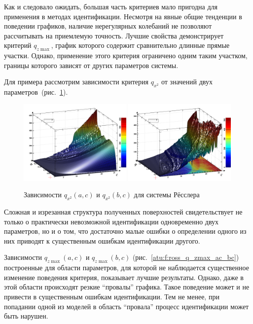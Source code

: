 Как и следовало ожидать, большая часть критериев мало пригодна
для применения в методах идентификации. Несмотря на явные
общие тенденции в поведении графиков, наличие нерегулярных колебаний
не позволяют рассчитывать на приемлемую точность.
Лучшие свойства демонстрирует критерий $q_{z \max{}}$,
график которого содержит сравнительно длинные прямые участки.
Однако, применение этого критерия ограничено одним таким участком,
границы которого зависят от других параметров системы.

Для примера рассмотрим зависимости критерия $q_{x^2}$
от значений двух параметров~(рис.~\ref{atu:f:ross_q_x2_ac_bc}).

\begin{figure}[ht!]
\begin{center}
  \includegraphics[width=0.49\textwidth]{p/cha/ross/ross_pwr-x_a_c.png}
  \hfill
  \includegraphics[width=0.49\textwidth]{p/cha/ross/ross_pwr-x_b_c.png}
\end{center}
  \caption{Зависимости $q_{x^2}(a,c)$ и  $q_{x^2}(b,c) $ для системы Рёсслера}
\label{atu:f:ross_q_x2_ac_bc}
\end{figure}

Сложная и изрезанная структура полученных поверхностей
свидетельствует не только о практически невозможной идентификации одновременно двух параметров,
но и о том, что достаточно малые ошибки о определении одного из них
приводят к существенным ошибкам идентификации другого.

Зависимости $q_{z \max{}}(a,c)$ и  $q_{z \max{}}(b,c) $
(рис.~\ref{atu:f:ross_q_zmax_ac_bc}) построенные для
области параметров, для которой не наблюдается существенное изменение
поведения критерия, показывает лучшие результаты. Однако,
даже в этой области происходят резкие ``провалы'' графика.
Такое поведение может и не привести в существенным ошибкам идентификации.
Тем не менее, при попадании одной из моделей в область ``провала''
процесс идентификации может быть нарушен.


